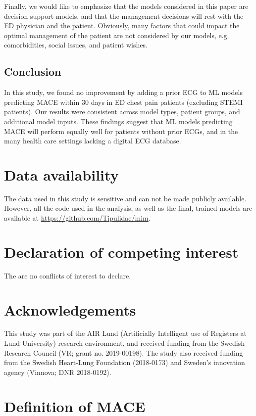 \documentclass[preprint]{elsarticle}
\begin{document}
Finally, we would like to emphasize that the models considered in this paper are decision support models, and that the management decisions will rest with the ED physician and the patient. Obviously, many factors that could impact the optimal management of the patient are not considered by our models, e.g. comorbidities, social issues, and patient wishes.

\subsection{Conclusion}
In this study, we found no improvement by adding a prior ECG to ML models predicting MACE within 30 days in ED chest pain patients (excluding STEMI patients). Our results were consistent across model types, patient groups, and additional model inputs. These findings suggest that ML models predicting MACE will perform equally well for patients without prior ECGs, and in the many health care settings lacking a digital ECG database.

\section*{Data availability}
The data used in this study is sensitive and can not be made publicly available. However, all the code used in the analysis, as well as the final, trained models are available at \url{https://github.com/Tipulidae/mim}. 

\section*{Declaration of competing interest}
The are no conflicts of interest to declare.

\section*{Acknowledgements}
This study was part of the AIR Lund (Artificially Intelligent use of Registers at Lund University) research environment, and received funding from the Swedish Research Council (VR; grant no. 2019-00198). The study also received funding from the Swedish Heart-Lung Foundation (2018-0173) and Sweden's innovation agency (Vinnova; DNR 2018-0192). 



\appendix
\section{Definition of MACE}
\label{sec:appendix:mace}
\end{document}
